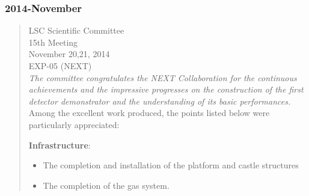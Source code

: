 \subsubsection*{2014-November}
\begin{quotation}
LSC Scientific Committee \\
15th Meeting \\
November 20,21, 2014\\

EXP-05 (NEXT)\\

{\em The committee congratulates the NEXT Collaboration for the continuous achievements and the impressive progresses on the construction of the first detector demonstrator and the understanding of its basic performances.} Among the excellent work produced, the points listed below were particularly appreciated:

{\bf Infrastructure}:
 \begin{itemize}
\item The completion and installation of the platform and castle structures
\item The completion of the gas system.
\end{itemize}
	 

\end{quotation}
